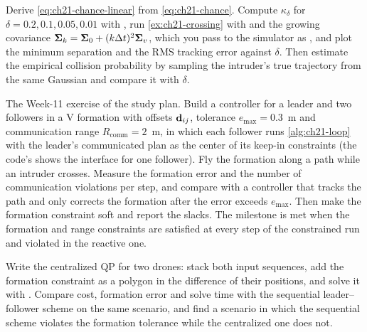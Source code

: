 \begin{exercise}[\difficulty{2}]
\label{exr:ch21-chance}
Derive \cref{eq:ch21-chance-linear} from \cref{eq:ch21-chance}. Compute
$\kappa_\delta$ for $\delta=0.2,0.1,0.05,0.01$ with , run
\cref{ex:ch21-crossing} with  and the growing
covariance $\mathbf{\Sigma}_k=\mathbf{\Sigma}_0+(k\Delta t)^2\mathbf{\Sigma}_v$, which you
pass to the simulator as
, and plot the minimum
separation and the RMS tracking error against $\delta$. Then estimate the
empirical collision probability by sampling the intruder's true trajectory
from the same Gaussian and compare it with $\delta$.
\end{exercise}

\begin{exercise}
\label{exr:ch21-coding}
The Week-11 exercise of the study plan. Build a controller for a leader and
two followers in a V formation with offsets $\mathbf{d}_{ij}$, tolerance
$e_{\max}=0.3$~m and communication range $R_{\mathrm{comm}}=2$~m, in which each
follower runs \cref{alg:ch21-loop} with the leader's communicated plan as the
center of its keep-in constraints (the code's  shows the
interface for one follower). Fly the formation along a path while an intruder
crosses. Measure the formation error and the number of communication
violations per step, and compare with a controller that tracks the path and
only corrects the formation after the error exceeds $e_{\max}$. Then make the
formation constraint soft and report the slacks. The milestone is met when
the formation and range constraints are satisfied at every step of the
constrained run and violated in the reactive one.
\end{exercise}

\begin{exercise}[\difficulty{3}]
\label{exr:ch21-centralised}
Write the centralized QP for two drones: stack both input sequences, add the
formation constraint as a polygon in the difference of their positions, and
solve it with . Compare cost, formation error and solve time
with the sequential leader--follower scheme on the same scenario, and find a
scenario in which the sequential scheme violates the formation tolerance while
the centralized one does not.
\end{exercise}
